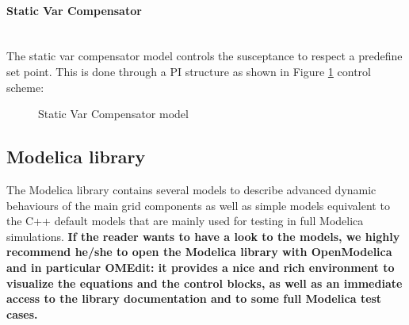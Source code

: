 \documentclass[a4paper, 12pt]{report}
\begin{document}
\paragraph{Static Var Compensator}
~~\\

The static var compensator model controls the susceptance to respect a predefine set point. This is done through a PI structure as shown in Figure \ref{StaticVarCompensator} control scheme:

\begin{figure}[h]
  \setlength{\abovecaptionskip}{15pt}
\centering
 \caption{Static Var Compensator model}
 \label{StaticVarCompensator}
\end{figure}

\subsection{Modelica library}

The \Dynawo Modelica library contains several models to describe advanced dynamic behaviours of the main grid components as well as simple models equivalent to the C++ default models that are mainly used for testing in full Modelica simulations. \textbf{If the reader wants to have a look to the models, we highly recommend he/she to open the \Dynawo Modelica library with OpenModelica and in particular OMEdit: it provides a nice and rich environment to visualize the equations and the control blocks, as well as an immediate access to the library documentation and to some full Modelica test cases. } \\
\end{document}
